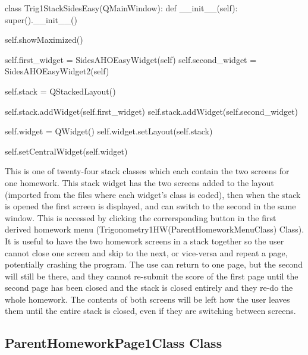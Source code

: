 \begin{python}
class Trig1StackSidesEasy(QMainWindow):
    def __init__(self):
        super().__init__()

        self.showMaximized()

        self.first_widget = SidesAHOEasyWidget(self)
        self.second_widget = SidesAHOEasyWidget2(self)

        self.stack = QStackedLayout()

        self.stack.addWidget(self.first_widget)
        self.stack.addWidget(self.second_widget)

        self.widget = QWidget()
        self.widget.setLayout(self.stack)

        self.setCentralWidget(self.widget)
\end{python}

This is one of twenty-four stack classes which each contain the two screens for one homework. This stack widget has the two screens added to the layout (imported from the files where each widget's class is coded), then when the stack is opened the first screen is displayed, and can switch to the second in the same window. This is accessed by clicking the corrersponding button in the first derived homework menu (Trigonometry1HW(ParentHomeworkMenuClass) Class). It is useful to have the two homework screens in a stack together so the user cannot close one screen and skip to the next, or vice-versa and repeat a page, potentially crashing the program. The use can return to one page, but the second will still be there, and they cannot re-submit the score of the first page until the second page has been closed and the stack is closed entirely and they re-do the whole homework. The contents of both screens will be left how the user leaves them until the entire stack is closed, even if they are switching between screens.

\subsection{ParentHomeworkPage1Class Class}

